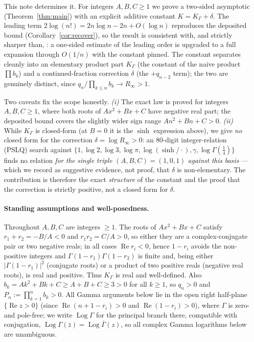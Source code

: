 \documentclass[11pt]{article}
\begin{document}
This note determines it. For integers $A,B,C\ge1$ we prove a two-sided asymptotic
(Theorem~\ref{thm:main}) with an explicit additive constant $K=K_\Gamma+\delta$.
The leading term $2\log(n!)=2n\log n-2n+O(\log n)$ reproduces the deposited bound
(Corollary~\ref{cor:recover}), so the result is consistent with, and strictly
sharper than, \cite{ladder}: a one-sided estimate of the leading order is upgraded
to a full expansion through $O(1/n)$ with the constant pinned. The constant
separates cleanly into an elementary product part $K_\Gamma$ (the constant of the
naive product $\prod b_k$) and a continued-fraction correction $\delta$ (the
$+q_{n-2}$ term); the two are genuinely distinct, since
$q_n/\prod_{k\le n}b_k\to R_\infty>1$.

Two caveats fix the scope honestly. \emph{(i)} The exact law is proved for
integers $A,B,C\ge1$, where both roots of $Ax^2+Bx+C$ have negative real part; the
deposited bound covers the slightly wider sign range $An^2+Bn+C>0$. \emph{(ii)}
While $K_\Gamma$ is closed-form (at $B=0$ it is the $\sinh$ expression above), we
give \emph{no} closed form for the correction $\delta=\log R_\infty>0$: an
$80$-digit integer-relation (PSLQ) search against
$\{1,\log2,\log3,\log\pi,\log(\sinh/\cdot),\gamma,\log\Gamma(\tfrac14)\}$ finds no
relation \emph{for the single triple $(A,B,C)=(1,0,1)$ against this basis} — which
we record as suggestive evidence, not proof, that $\delta$ is non-elementary. The
contribution is therefore the exact \emph{structure} of the constant and the proof
that the correction is strictly positive, not a closed form for $\delta$.

\paragraph{Standing assumptions and well-posedness.}
Throughout $A,B,C$ are integers $\ge 1$. The roots of $Ax^2+Bx+C$ satisfy
$r_1+r_2=-B/A<0$ and $r_1r_2=C/A>0$, so either they are a complex-conjugate pair
or two negative reals; in all cases $\operatorname{Re}r_i<0$, hence $1-r_i$ avoids
the non-positive integers and $\Gamma(1-r_1)\Gamma(1-r_2)$ is finite and, being
either $|\Gamma(1-r_1)|^2$ (conjugate roots) or a product of two positive reals
(negative real roots), is real and positive. Thus $K_\Gamma$ is real and
well-defined. Also $b_k=Ak^2+Bk+C\ge A+B+C\ge 3>0$ for all $k\ge1$, so $q_n>0$ and
$P_n:=\prod_{k=1}^n b_k>0$. All Gamma arguments below lie in the open right
half-plane $\{\operatorname{Re}z>0\}$ (since $\operatorname{Re}(n+1-r_i)>0$ and
$\operatorname{Re}(1-r_i)>0$), where $\Gamma$ is zero- and pole-free; we write
$\operatorname{Log}\Gamma$ for the principal branch there, compatible with
conjugation, $\operatorname{Log}\Gamma(\bar z)=\overline{\operatorname{Log}\Gamma(z)}$,
so all complex Gamma logarithms below are unambiguous.
\end{document}
